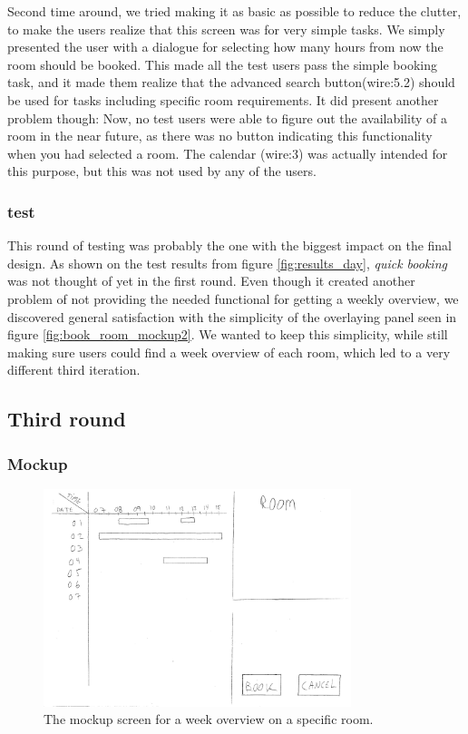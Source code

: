 Second time around, we tried making it as basic as possible to reduce the clutter, to make the users realize that this screen was for very simple tasks. We simply presented the user with a dialogue for selecting how many hours from now the room should be booked. This made all the test users pass the simple booking task, and it made them realize that the advanced search button(wire:5.2) should be used for tasks including specific room requirements. It did present another problem though: Now, no test users were able to figure out the availability of a room in the near future, as there was no button indicating this functionality when you had selected a room. The calendar (wire:3) was actually intended for this purpose, but this was not used by any of the users.\\

\subsubsection{test}
This round of testing was probably the one with the biggest impact on the final design. As shown on the test results from figure \ref{fig:results_day}, \emph{quick booking} was not thought of yet in the first round. Even though it created another problem of not providing the needed functional for getting a weekly overview, we discovered general satisfaction with the simplicity of the overlaying panel seen in figure \ref{fig:book_room_mockup2}. We wanted to keep this simplicity, while still making sure users could find a week overview of each room, which led to a very different third iteration.
\pagebreak

\subsection{Third round}
\subsubsection{Mockup}
\begin{figure}[htb]
\begin{center}
\leavevmode
\includegraphics[width=0.8\textwidth]{images/weekMockup}
\end{center}
\caption{The mockup screen for a week overview on a specific room.}
\label{fig:week_mockup}
\end{figure}

